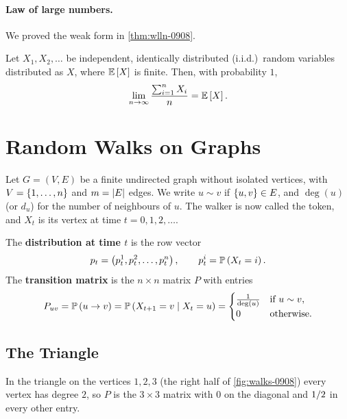 
\paragraph{Law of large numbers.} We proved the weak form in \cref{thm:wlln-0908}.

\begin{theorem}\label{thm:slln-0910}
    Let $X_1, X_2, \dots$ be independent, identically distributed (i.i.d.)\ random variables
    distributed as $X$, where $\expectation{X}$ is finite. Then, with probability $1$,
    \[\lim_{n \to \infty} \frac{\sum_{i=1}^{n} X_i}{n} = \expectation{X}.\]
\end{theorem}

\section{Random Walks on Graphs}

Let $G = (V, E)$ be a finite undirected graph without isolated vertices, with
$V = \left\lbrace1, \dots, n\right\rbrace$ and $m = \left\lvert E\right\rvert$ edges. We write $u \sim v$ if $\left\lbrace u,v\right\rbrace \in E$, and
$\deg(u)$ (or $d_u$) for the number of neighbours of $u$. The walker is now called the token, and
$X_t$ is its vertex at time $t = 0, 1, 2, \dots$.

\begin{definition}\label{def:walk-0910}
    The \textbf{distribution at time $t$} is the row vector
    \[p_t = \left(p_t^1, p_t^2, \dots, p_t^n\right), \qquad p_t^i = \prob{X_t = i}.\]
    The \textbf{transition matrix} is the $n \times n$ matrix $P$ with entries
    \[P_{uv} = \prob{u \to v} = \prob{X_{t+1} = v \given X_t = u}
        = \begin{cases}
            \frac{1}{\deg(u)} & \text{if } u \sim v, \\
            0                 & \text{otherwise.}
        \end{cases}\]
\end{definition}

\subsection{The Triangle}

In the triangle on the vertices $1, 2, 3$ (the right half of \cref{fig:walks-0908}) every vertex has
degree $2$, so $P$ is the $3 \times 3$ matrix with $0$ on the diagonal and $1/2$ in every
other entry.


